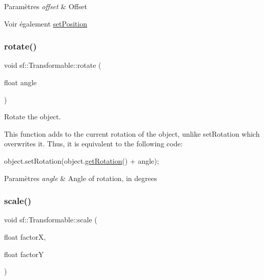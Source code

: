 \begin{DoxyParams}{Paramètres}
{\em offset} & Offset\\
\hline
\end{DoxyParams}
\begin{DoxySeeAlso}{Voir également}
\hyperlink{classsf_1_1Transformable_a4dbfb1a7c80688b0b4c477d706550208}{set\+Position} 
\end{DoxySeeAlso}
\mbox{\label{classsf_1_1Transformable_af8a5ffddc0d93f238fee3bf8efe1ebda}} 
\subsubsection{\texorpdfstring{rotate()}{rotate()}}
{\footnotesize\ttfamily void sf\+::\+Transformable\+::rotate (\begin{DoxyParamCaption}\item[{float}]{angle }\end{DoxyParamCaption})}



Rotate the object. 

This function adds to the current rotation of the object, unlike set\+Rotation which overwrites it. Thus, it is equivalent to the following code\+: 
\begin{DoxyCode}
\textcolor{keywordtype}{object}.setRotation(\textcolor{keywordtype}{object}.\hyperlink{classsf_1_1Transformable_aa00b5c5d4a06ac24a94dd72c56931d3a}{getRotation}() + angle);
\end{DoxyCode}



\begin{DoxyParams}{Paramètres}
{\em angle} & Angle of rotation, in degrees \\
\hline
\end{DoxyParams}
\mbox{\label{classsf_1_1Transformable_a3de0c6d8957f3cf318092f3f60656391}} 
\subsubsection{\texorpdfstring{scale()}{scale()}\hspace{0.1cm}{\footnotesize\ttfamily [1/2]}}
{\footnotesize\ttfamily void sf\+::\+Transformable\+::scale (\begin{DoxyParamCaption}\item[{float}]{factorX,  }\item[{float}]{factorY }\end{DoxyParamCaption})}



